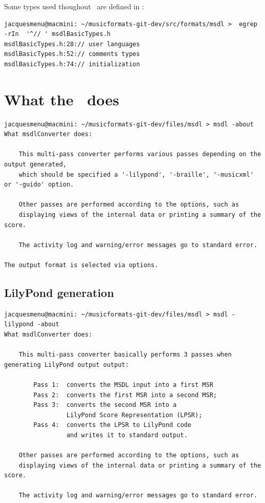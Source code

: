 Some types used thoughout \msrRepr\ are defined in :%
\begin{lstlisting}[language=Terminal]
jacquesmenu@macmini: ~/musicformats-git-dev/src/formats/msdl >  egrep -rIn  '^// ' msdlBasicTypes.h
msdlBasicTypes.h:28:// user languages
msdlBasicTypes.h:52:// comments types
msdlBasicTypes.h:74:// initialization
\end{lstlisting}


\section{What the \msdLangConv\ does}

\begin{lstlisting}[language=Terminal]
jacquesmenu@macmini: ~/musicformats-git-dev/files/msdl > msdl -about
What msdlConverter does:

    This multi-pass converter performs various passes depending on the output generated,
    which should be specified a '-lilypond', '-braille', '-musicxml' or '-guido' option.

    Other passes are performed according to the options, such as
    displaying views of the internal data or printing a summary of the score.

    The activity log and warning/error messages go to standard error.

The output format is selected via options.
\end{lstlisting}

\subsection{LilyPond generation}

\begin{lstlisting}[language=Terminal]
jacquesmenu@macmini: ~/musicformats-git-dev/files/msdl > msdl -lilypond -about
What msdlConverter does:

    This multi-pass converter basically performs 3 passes when generating LilyPond output output:

        Pass 1:  converts the MSDL input into a first MSR
        Pass 2:  converts the first MSR into a second MSR;
        Pass 3:  converts the second MSR into a
                 LilyPond Score Representation (LPSR);
        Pass 4:  converts the LPSR to LilyPond code
                 and writes it to standard output.

    Other passes are performed according to the options, such as
    displaying views of the internal data or printing a summary of the score.

    The activity log and warning/error messages go to standard error.
\end{lstlisting}

